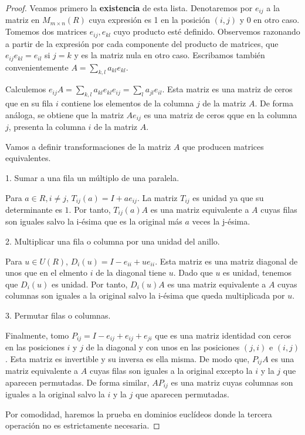 \begin{proof}
Veamos primero la \textbf{existencia} de esta lista. Denotaremos por $e_{ij}$ a la matriz en $M_{m \times n}(R)$ cuya expresión es 1 en la posición $(i,j)$ y 0 en otro caso. Tomemos dos matrices $e_{ij},e_{kl}$ cuyo producto esté definido. Observemos razonando a partir de la expresión por cada componente del producto de matrices, que $e_{ij}e_{kl} = e_{il}$ si $j = k$ y es la matriz nula en otro caso. Escribamos también convenientemente $A = \sum_{k,l} a_{kl}e_{kl}$. 

Calculemos $e_{ij}A = \sum_{k,l} a_{kl}e_{kl}e_{ij} = \sum_{l} a_{jl}e_{il}$. Esta matriz es una matriz de ceros que en su fila $i$ contiene los elementos de la columna $j$ de la matriz $A$. De forma análoga, se obtiene que la matriz $Ae_{ij}$ es una matriz de ceros qque en la columna $j$, presenta la columna $i$ de la matriz $A$. 

Vamos a definir transformaciones de la matriz $A$ que producen matrices equivalentes.

1. Sumar a una fila un múltiplo de una paralela.

Para $a \in R, i \neq j$, $T_{ij}(a) = I + ae_{ij}$. La matriz $T_{ij}$ es unidad ya que su determinante es $1$. Por tanto, $T_{ij}(a)A$ es una matriz equivalente a $A$ cuyas filas son iguales salvo la i-ésima que es la original más $a$ veces la j-ésima. 

2. Multiplicar una fila o columna por una unidad del anillo.

Para $u \in U(R)$, $D_i(u) = I - e_{ii} +ue_{ii}$. Esta matriz es una matriz diagonal de unos que en el elmento $i$ de la diagonal tiene $u$. Dado que $u$ es unidad, tenemos que $D_i(u)$ es unidad. Por tanto, $D_i(u)A$ es una matriz equivalente a $A$ cuyas columnas son iguales a la original salvo la i-ésima que queda multiplicada por $u$. 

3. Permutar filas o columnas. 

Finalmente, tomo $P_{ij} = I - e_{ij} + e_{ij} + e_{ji}$ que es una matriz identidad con ceros en las posiciones $i$ y $j$ de la diagonal y con unos en las posiciones $(j,i)$ e $(i,j)$. Esta matriz es invertible y su inversa es ella misma. De modo que, $P_{ij}A$ es una matriz equivalente a $A$ cuyas filas son iguales a la original excepto la $i$ y  la $j$ que aparecen permutadas. De forma similar, $AP_{ij}$ es una matriz cuyas columnas son iguales a la original salvo la $i$ y la $j$ que aparecen permutadas. 

Por comodidad, haremos la prueba en dominios euclídeos donde la tercera operación no es estrictamente necesaria. 


\end{proof}

